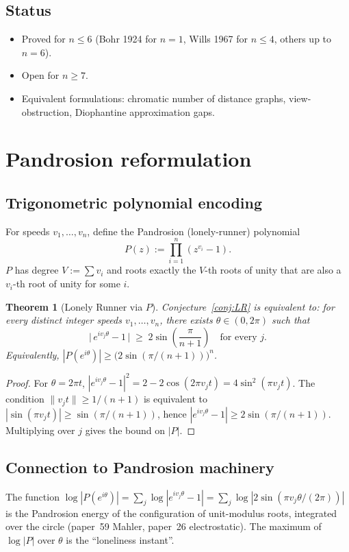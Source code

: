 \documentclass[11pt,a4paper]{article}
\newtheorem{theorem}{Theorem}[section]
\begin{document}
\subsection{Status}
\begin{itemize}
\item Proved for $n \le 6$ (Bohr 1924 for $n=1$, Wills 1967 for $n \le 4$, others up to $n = 6$).
\item Open for $n \ge 7$.
\item Equivalent formulations: chromatic number of distance graphs, view-obstruction,
Diophantine approximation gaps.
\end{itemize}

\section{Pandrosion reformulation}\label{sec:reform}

\subsection{Trigonometric polynomial encoding}
For speeds $v_1, \ldots, v_n$, define the Pandrosion (lonely-runner) polynomial
\[
P(z) := \prod_{i=1}^n (z^{v_i} - 1).
\]
$P$ has degree $V := \sum v_i$ and roots exactly the $V$-th roots of unity that
are also a $v_i$-th root of unity for some $i$.

\begin{theorem}[Lonely Runner via $P$]\label{thm:reform}
Conjecture~\ref{conj:LR} is equivalent to: for every distinct integer speeds
$v_1, \ldots, v_n$, there exists $\theta \in (0, 2\pi)$ such that
\[
\bigl|\, e^{i v_j \theta} - 1\,\bigr| \;\ge\; 2 \sin\!\left(\frac{\pi}{n+1}\right)
\quad \text{for every } j.
\]
Equivalently, $|P(e^{i\theta})| \ge \bigl(2 \sin(\pi/(n+1))\bigr)^n$.
\end{theorem}

\begin{proof}
For $\theta = 2\pi t$, $|e^{i v_j \theta} - 1|^2 = 2 - 2\cos(2\pi v_j t)
= 4 \sin^2(\pi v_j t)$. The condition $\|v_j t\| \ge 1/(n+1)$ is equivalent to
$|\sin(\pi v_j t)| \ge \sin(\pi/(n+1))$, hence $|e^{i v_j \theta} - 1| \ge
2 \sin(\pi/(n+1))$. Multiplying over $j$ gives the bound on $|P|$.
\end{proof}

\subsection{Connection to Pandrosion machinery}
The function $\log |P(e^{i\theta})| = \sum_j \log|e^{i v_j \theta} - 1| =
\sum_j \log|2 \sin(\pi v_j \theta / (2\pi))|$ is the Pandrosion energy of the
configuration of unit-modulus roots, integrated over the circle (paper~59 Mahler,
paper~26 electrostatic). The maximum of $\log|P|$ over $\theta$ is the
``loneliness instant''.
\end{document}
